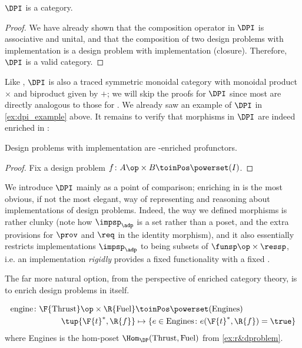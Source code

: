 \begin{lemma}
    $\DPI$ is a category.
\end{lemma}

\begin{proof}
    We have already shown that the composition operator in $\DPI$ is associative and unital, and that the composition of two design problems with implementation is a design problem with implementation (closure). Therefore, $\DPI$ is a valid category.
\end{proof}

Like \DP, $\DPI$ is also a traced symmetric monoidal category with monoidal product $\times$ and biproduct given by $+$; we will skip the proofs for $\DPI$ since most are directly analogous to those for \DP. We already saw an example of $\DPI$ in \cref{ex:dpi_example} above. It remains to verify that morphisms in $\DPI$ are indeed enriched in \Set:

\begin{proposition}
    Design problems with implementation are \Set-enriched profunctors.
\end{proposition}
\begin{proof}
    Fix a design problem $f \colon A\op \times B \toinPos \powerset(I)$.
\end{proof}

We introduce $\DPI$ mainly as a point of comparison; enriching in \Set is the most obvious, if not the most elegant, way of representing and reasoning about implementations of design problems. Indeed, the way we defined morphisms is rather clunky (note how $\impsp_\adp$ is a set rather than a poset, and the extra provisions for $\prov$ and $\req$ in the identity morphism), and it also essentially restricts implementations $\impsp_\adp$ to being subsets of $\funsp\op \times \ressp$, i.e. an implementation \emph{rigidly} provides a fixed functionality \fun with a fixed \res.

The far more natural option, from the perspective of enriched category theory, is to enrich design problems in \DP itself.

\begin{example}
    \begin{equation}
        \begin{aligned}
            \text{engine} \colon \F{\text{Thrust}}\op \times \R{\text{Fuel}} &\toinPos \powerset(\text{Engines}) \\
            \tup{\F{t}^*,\R{f}} &\mapsto \{ e \in \text{Engines} \colon e(\F{t}^*, \R{f}) = \true \}
        \end{aligned}
    \end{equation}
    where Engines is the hom-poset $\Hom_\DP(\text{Thrust}, \text{Fuel})$ from \cref{ex:r&dproblem}.
\end{example}


